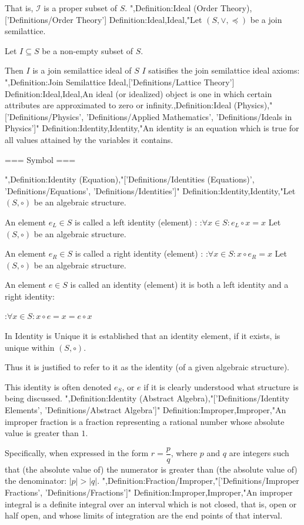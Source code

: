 That is,  $\mathcal I$ is a proper subset of $S$.
",Definition:Ideal (Order Theory),['Definitions/Order Theory']
Definition:Ideal,Ideal,"Let $\left( S, \vee, \preceq \right)$ be a join semilattice.

Let $I \subseteq S$ be a non-empty subset of $S$.


Then $I$ is a join semilattice ideal of $S$  $I$ satisifies the join semilattice ideal axioms:
",Definition:Join Semilattice Ideal,['Definitions/Lattice Theory']
Definition:Ideal,Ideal,An ideal (or idealized) object is one in which certain attributes are approximated to zero or infinity.,Definition:Ideal (Physics),"['Definitions/Physics', 'Definitions/Applied Mathematics', 'Definitions/Ideals in Physics']"
Definition:Identity,Identity,"An identity is an equation which is true for all values attained by the variables it contains.


=== Symbol ===

",Definition:Identity (Equation),"['Definitions/Identities (Equations)', 'Definitions/Equations', 'Definitions/Identities']"
Definition:Identity,Identity,"Let $\left( S, \circ \right)$ be an algebraic structure.

An element $e_L \in S$ is called a left identity (element) :
:$\forall x \in S: e_L \circ x = x$
Let $\left( S, \circ \right)$ be an algebraic structure.

An element $e_R \in S$ is called a right identity (element) :
:$\forall x \in S: x \circ e_R = x$
Let $\left( S, \circ \right)$ be an algebraic structure.

An element $e \in S$ is called an identity (element)  it is both a left identity and a right identity:

:$\forall x \in S: x \circ e = x = e \circ x$


In Identity is Unique it is established that an identity element, if it exists, is unique within $\left( S, \circ \right)$.

Thus it is justified to refer to it as the identity (of a given algebraic structure).


This identity is often denoted $e_S$, or $e$ if it is clearly understood what structure is being discussed.
",Definition:Identity (Abstract Algebra),"['Definitions/Identity Elements', 'Definitions/Abstract Algebra']"
Definition:Improper,Improper,"An improper fraction is a fraction representing a rational number whose absolute value is greater than $1$.

Specifically, when expressed in the form $r = \dfrac p q$, where $p$ and $q$ are integers such that (the absolute value of) the numerator is greater than (the absolute value of) the denominator: $\left\lvert p \right\rvert > \left\lvert q \right\rvert$.
",Definition:Fraction/Improper,"['Definitions/Improper Fractions', 'Definitions/Fractions']"
Definition:Improper,Improper,"An improper integral is a definite integral over an interval which is not closed, that is, open or half open, and whose limits of integration are the end points of that interval.

